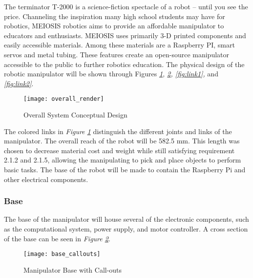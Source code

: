 The terminator T-2000 is a science-fiction spectacle of a robot -- until you see the price. Channeling the inspiration many high school students may have for robotics, MEIOSIS robotics aims to provide an affordable manipulator to educators and enthusiasts. MEIOSIS uses primarily 3-D printed components and easily accessible materials. Among these materials are a Raspberry PI, smart servos and metal tubing. These features create an open-source manipulator accessible to the public to further robotics education.
The physical design of the robotic manipulator will be shown through Figures \emph{\ref{fig:overall}, \ref{fig:base}, \ref{fig:link1},} and \emph{\ref{fig:link2}}.

\begin{figure}[htp]
  \centering
  \texttt{[image: overall\_render]}
  \caption{Overall System Conceptual Design }
  \label{fig:overall}
\end{figure}

The colored links in \emph{Figure \ref{fig:overall}} distinguish the different joints and links of the manipulator. The overall reach of the robot will be 582.5 mm. This length was chosen to decrease material cost and weight while still satisfying requirement 2.1.2 and 2.1.5, allowing the manipulating to pick and place objects to perform basic tasks. The base of the robot will be made to contain the Raspberry Pi and other electrical components.
\newpage
\subsubsection{Base}
The base of the manipulator will house several of the electronic components, such as the computational system, power supply, and motor controller. A cross section of the base can be seen in \emph{Figure \ref{fig:base}}.
\begin{figure}[htp]
  \centering
  \texttt{[image: base\_callouts]}
  \caption{Manipulator Base with Call-outs}
  \label{fig:base}
\end{figure}

